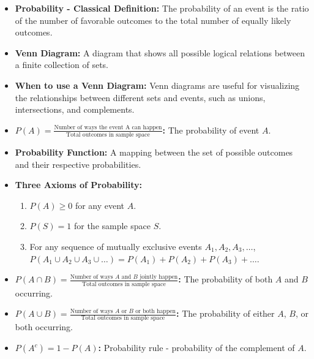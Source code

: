 \documentclass{article}
\begin{document}
\begin{itemize}
    \item \textbf{Probability - Classical Definition:} The probability of an event is the ratio of the number of favorable outcomes to the total number of equally likely outcomes.
    
    \item \textbf{Venn Diagram:} A diagram that shows all possible logical relations between a finite collection of sets.
    
    \item \textbf{When to use a Venn Diagram:} Venn diagrams are useful for visualizing the relationships between different sets and events, such as unions, intersections, and complements.
    
    \item \textbf{\( P(A) = \frac{\text{Number of ways the event A can happen}}{\text{Total outcomes in sample space}} \):} The probability of event \( A \).
    
    \item \textbf{Probability Function:} A mapping between the set of possible outcomes and their respective probabilities.
    
    \item \textbf{Three Axioms of Probability:}
    \begin{enumerate}
        \item \( P(A) \geq 0 \) for any event \( A \).
        \item \( P(S) = 1 \) for the sample space \( S \).
        \item For any sequence of mutually exclusive events \( A_1, A_2, A_3, \ldots \), \( P(A_1 \cup A_2 \cup A_3 \cup \ldots) = P(A_1) + P(A_2) + P(A_3) + \ldots \).
    \end{enumerate}
    
    \item \textbf{\( P(A \cap B) = \frac{\text{Number of ways } A \text{ and } B \text{ jointly happen}}{\text{Total outcomes in sample space}} \):} The probability of both \( A \) and \( B \) occurring.
    
    \item \textbf{\( P(A \cup B) = \frac{\text{Number of ways } A \text{ or } B \text{ or both happen}}{\text{Total outcomes in sample space}} \):} The probability of either \( A \), \( B \), or both occurring.
    
    \item \textbf{\( P(A^c) = 1 - P(A) \):} Probability rule - probability of the complement of \( A \).
    

\end{itemize}
\end{document}
